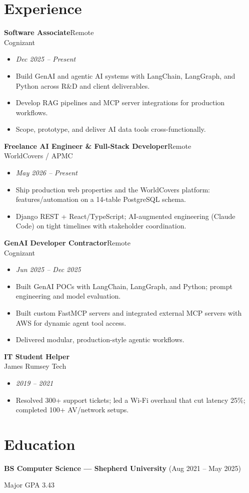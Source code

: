 \documentclass[10pt]{article}
\newcommand{\dentry}[4]{\noindent\textbf{#1}\hfill{#2}\\{#3}\hfill{#4}\par}
\begin{document}
\section*{Experience}
\dentry{Software Associate}{Remote}{Cognizant}{}
\begin{itemize}
  \item \textit{Dec 2025 – Present}
  \item Build GenAI and agentic AI systems with LangChain, LangGraph, and Python across R\&D and client deliverables.
  \item Develop RAG pipelines and MCP server integrations for production workflows.
  \item Scope, prototype, and deliver AI data tools cross-functionally.
\end{itemize}
\dentry{Freelance AI Engineer \& Full-Stack Developer}{Remote}{WorldCovers / APMC}{}
\begin{itemize}
  \item \textit{May 2026 – Present}
  \item Ship production web properties and the WorldCovers platform: features/automation on a 14-table PostgreSQL schema.
  \item Django REST + React/TypeScript; AI-augmented engineering (Claude Code) on tight timelines with stakeholder coordination.
\end{itemize}
\dentry{GenAI Developer Contractor}{Remote}{Cognizant}{}
\begin{itemize}
  \item \textit{Jun 2025 – Dec 2025}
  \item Built GenAI POCs with LangChain, LangGraph, and Python; prompt engineering and model evaluation.
  \item Built custom FastMCP servers and integrated external MCP servers with AWS for dynamic agent tool access.
  \item Delivered modular, production-style agentic workflows.
\end{itemize}
\dentry{IT Student Helper}{}{James Rumsey Tech}{}
\begin{itemize}
  \item \textit{2019 – 2021}
  \item Resolved 300+ support tickets; led a Wi-Fi overhaul that cut latency 25\%; completed 100+ AV/network setups.
\end{itemize}
\section*{Education}
\noindent \textbf{BS Computer Science — Shepherd University} (Aug 2021 – May 2025)\par
\noindent Major GPA 3.43\par
\end{document}
